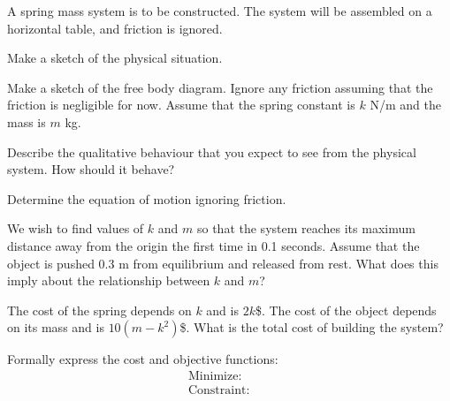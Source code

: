 \begin{problem}
\item A spring mass system is to be constructed. The system will be
  assembled on a horizontal table, and friction is ignored. 
  \begin{subproblem}
    \item Make a sketch of the physical situation.
      \vfill
    \item Make a sketch of the free body diagram. Ignore any friction
      assuming that the friction is negligible for now. Assume that
      the spring constant is $k$ N/m and the mass is $m$ kg.
      \vfill
    \item Describe the qualitative behaviour that you expect to see
      from the physical system. How should it behave?
      \vfill
    \item Determine the equation of motion ignoring friction.
      \vfill
  \end{subproblem}

  \clearpage

\item We wish to find values of $k$ and $m$ so that the system reaches
  its maximum distance away from the origin the first time in 0.1
  seconds. Assume that the object is pushed 0.3 m from equilibrium and
  released from rest. What does this imply about the relationship
  between $k$ and $m$?  
  \vfill

\item The cost of the spring depends on $k$ and is $2k$\$. The cost of
  the object depends on its mass and is $10(m-k^2)$\$. What is the
  total cost of building the system?

  \vfill

\item Formally express the cost and objective functions:
    \begin{eqnarray*}
      \mathrm{Minimize:} & &  \\
      \mathrm{Constraint:} & & 
    \end{eqnarray*}



\end{problem}

